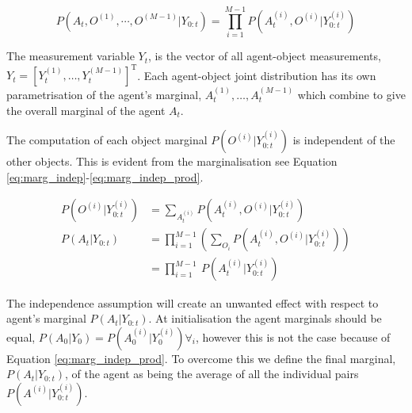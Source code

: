 \begin{equation}\label{eq:pair_wise_joint}
 P(A_t,O^{(1)},\cdots,O^{(M-1)}|Y_{0:t}) = \prod\limits_{i=1}^{M-1} P(A^{(i)}_t,O^{(i)}|Y^{(i)}_{0:t})
\end{equation}

The measurement variable $Y_t$, is the vector of all agent-object 
measurements, $Y_t = \left[Y^{(1)}_t,\dots,Y^{(M-1)}_t\right]^{\mathrm{T}}$. Each agent-object joint distribution has its own parametrisation of the agent's marginal,
$A^{(1)}_t,\dots,A^{(M-1)}_t$ which combine to give the overall marginal of the agent $A_t$.


The computation of each object marginal $P(O^{(i)}|Y^{(i)}_{0:t})$ is independent of the other objects. This is evident from the marginalisation 
see Equation \ref{eq:marg_indep}-\ref{eq:marg_indep_prod}.

\begin{align}
 P(O^{(i)}|Y^{(i)}_{0:t}) &= \sum\limits_{A^{(i)}_t} P(A^{(i)}_t,O^{(i)}|Y^{(i)}_{0:t}) \label{eq:marg_indep} \\
 P(A_t|Y_{0:t})           &= \prod\limits_{i=1}^{M-1} \left(\sum\limits_{O_i} P(A^{(i)}_t,O^{(i)}|Y^{(i)}_{0:t})\right)  \\
	                  &= \prod\limits_{i=1}^{M-1} \ P(A^{(i)}_t|Y^{(i)}_{0:t}) \label{eq:marg_indep_prod}
\end{align}

The independence assumption will create an unwanted effect with respect to agent's marginal $P(A_t|Y_{0:t})$. 
At initialisation the agent marginals should be equal, $P(A_0|Y_0) = P(A^{(i)}_0|Y^{(i)}_0) \forall_i$, however this is not the case because of 
Equation \ref{eq:marg_indep_prod}. To overcome this we define the final marginal, $P(A_t|Y_{0:t})$, of the agent as being the average of all the individual
pairs $P(A^{(i)}|Y^{(i)}_{0:t})$.

